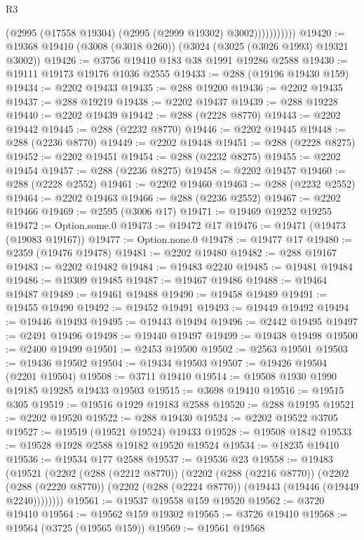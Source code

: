 \begin{lexlean}{R3}
\begin{coremodule}
                      (@2995 (@17558 @19304) (@2995 (@2999 @19302) @3002)))))))))))
@19420 := @19368 @19410 (@3008 (@3018 @260)) (@3024 (@3025 (@3026 @1993) @19321 @3002))
@19426 := @3756 @19410 @183 @38 @1991 @19286 @2588
@19430 := @19111 @19173 @19176 @1036 @2555
@19433 := @288 (@19196 @19430 @159)
@19434 := @2202 @19433
@19435 := @288 @19200
@19436 := @2202 @19435
@19437 := @288 @19219
@19438 := @2202 @19437
@19439 := @288 @19228
@19440 := @2202 @19439
@19442 := @288 (@2228 @8770)
@19443 := @2202 @19442
@19445 := @288 (@2232 @8770)
@19446 := @2202 @19445
@19448 := @288 (@2236 @8770)
@19449 := @2202 @19448
@19451 := @288 (@2228 @8275)
@19452 := @2202 @19451
@19454 := @288 (@2232 @8275)
@19455 := @2202 @19454
@19457 := @288 (@2236 @8275)
@19458 := @2202 @19457
@19460 := @288 (@2228 @2552)
@19461 := @2202 @19460
@19463 := @288 (@2232 @2552)
@19464 := @2202 @19463
@19466 := @288 (@2236 @2552)
@19467 := @2202 @19466
@19469 := @2595 (@3006 @17)
@19471 := @19469 @19252 @19255
@19472 := Option.some.{0}
@19473 := @19472 @17
@19476 := @19471 (@19473 (@19083 @19167))
@19477 := Option.none.{0}
@19478 := @19477 @17
@19480 := @2359 (@19476 @19478)
@19481 := @2202 @19480
@19482 := @288 @19167
@19483 := @2202 @19482
@19484 := @19483 @2240
@19485 := @19481 @19484
@19486 := @19309 @19485
@19487 := @19467 @19486
@19488 := @19464 @19487
@19489 := @19461 @19488
@19490 := @19458 @19489
@19491 := @19455 @19490
@19492 := @19452 @19491
@19493 := @19449 @19492
@19494 := @19446 @19493
@19495 := @19443 @19494
@19496 := @2442 @19495
@19497 := @2491 @19496
@19498 := @19440 @19497
@19499 := @19438 @19498
@19500 := @2400 @19499
@19501 := @2453 @19500
@19502 := @2563 @19501
@19503 := @19436 @19502
@19504 := @19434 @19503
@19507 := @19426 @19504 (@2201 @19504)
@19508 := @3711 @19410
@19514 := @19508 @1930 @1990 @19185 @19285 @19433 @19503
@19515 := @3698 @19410
@19516 := @19515 @305
@19519 := @19516 @1929 @19183 @2588
@19520 := @288 @19195
@19521 := @2202 @19520
@19522 := @288 @19430
@19524 := @2202 @19522 @3705
@19527 := @19519 (@19521 @19524) @19433
@19528 := @19508 @1842
@19533 := @19528 @1928 @2588 @19182 @19520 @19524
@19534 := @18235 @19410
@19536 := @19534 @177 @2588
@19537 := @19536 @23
@19558 := @19483
    (@19521
      (@2202
        (@288 (@2212 @8770))
        (@2202
          (@288 (@2216 @8770))
          (@2202
            (@288 (@2220 @8770))
            (@2202 (@288 (@2224 @8770)) (@19443 (@19446 (@19449 @2240))))))))
@19561 := @19537 @19558 @159 @19520
@19562 := @3720 @19410
@19564 := @19562 @159 @19302
@19565 := @3726 @19410
@19568 := @19564 (@3725 (@19565 @159))
@19569 := @19561 @19568

\end{coremodule}
\end{lexlean}
